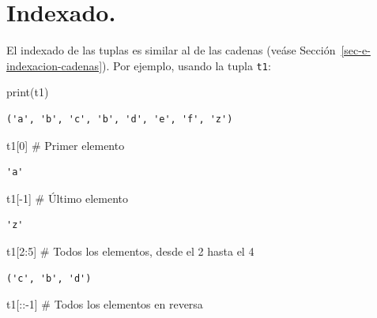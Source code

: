 \documentclass[
  spanish,
  letterpaper,
]{scrbook}
\newenvironment{Shaded}{\begin{snugshade}}{\end{snugshade}}
\newcommand{\BuiltInTok}[1]{\textcolor[rgb]{0.00,0.23,0.31}{#1}}
\newcommand{\CommentTok}[1]{\textcolor[rgb]{0.37,0.37,0.37}{#1}}
\newcommand{\DecValTok}[1]{\textcolor[rgb]{0.68,0.00,0.00}{#1}}
\newcommand{\NormalTok}[1]{\textcolor[rgb]{0.00,0.23,0.31}{#1}}
\newcommand{\OperatorTok}[1]{\textcolor[rgb]{0.37,0.37,0.37}{#1}}
\theoremstyle{definition}
\theoremstyle{remark}
\begin{document}
\section{Indexado.}\label{indexado.}

El indexado de las tuplas es similar al de las cadenas (veáse
Sección~\ref{sec-e-indexacion-cadenas}). Por ejemplo, usando la tupla
\texttt{t1}:

\begin{Shaded}
\begin{Highlighting}[]
\BuiltInTok{print}\NormalTok{(t1)}
\end{Highlighting}
\end{Shaded}

\begin{verbatim}
('a', 'b', 'c', 'b', 'd', 'e', 'f', 'z')
\end{verbatim}

\begin{Shaded}
\begin{Highlighting}[]
\NormalTok{t1[}\DecValTok{0}\NormalTok{]  }\CommentTok{\# Primer elemento}
\end{Highlighting}
\end{Shaded}

\begin{verbatim}
'a'
\end{verbatim}

\begin{Shaded}
\begin{Highlighting}[]
\NormalTok{t1[}\OperatorTok{{-}}\DecValTok{1}\NormalTok{] }\CommentTok{\# Último elemento}
\end{Highlighting}
\end{Shaded}

\begin{verbatim}
'z'
\end{verbatim}

\begin{Shaded}
\begin{Highlighting}[]
\NormalTok{t1[}\DecValTok{2}\NormalTok{:}\DecValTok{5}\NormalTok{] }\CommentTok{\# Todos los elementos, desde el 2 hasta el 4}
\end{Highlighting}
\end{Shaded}

\begin{verbatim}
('c', 'b', 'd')
\end{verbatim}

\begin{Shaded}
\begin{Highlighting}[]
\NormalTok{t1[::}\OperatorTok{{-}}\DecValTok{1}\NormalTok{] }\CommentTok{\# Todos los elementos en reversa}
\end{Highlighting}
\end{Shaded}
\end{document}
